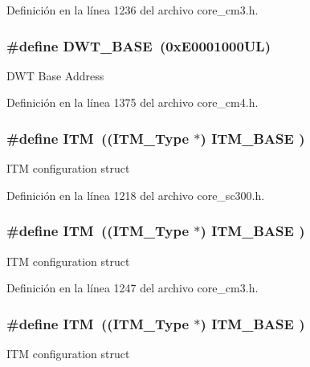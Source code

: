 Definición en la línea 1236 del archivo core\+\_\+cm3.\+h.

\subsubsection[{\texorpdfstring{D\+W\+T\+\_\+\+B\+A\+SE}{DWT_BASE}}]{\setlength{\rightskip}{0pt plus 5cm}\#define D\+W\+T\+\_\+\+B\+A\+SE~(0x\+E0001000\+U\+L)}\hypertarget{group___c_m_s_i_s__core__base_gafdab534f961bf8935eb456cb7700dcd2}{}\label{group___c_m_s_i_s__core__base_gafdab534f961bf8935eb456cb7700dcd2}
D\+WT Base Address 

Definición en la línea 1375 del archivo core\+\_\+cm4.\+h.

\subsubsection[{\texorpdfstring{I\+TM}{ITM}}]{\setlength{\rightskip}{0pt plus 5cm}\#define I\+TM~(({\bf I\+T\+M\+\_\+\+Type}       $\ast$)     {\bf I\+T\+M\+\_\+\+B\+A\+SE}      )}\hypertarget{group___c_m_s_i_s__core__base_gabae7cdf882def602cb787bb039ff6a43}{}\label{group___c_m_s_i_s__core__base_gabae7cdf882def602cb787bb039ff6a43}
I\+TM configuration struct 

Definición en la línea 1218 del archivo core\+\_\+sc300.\+h.

\subsubsection[{\texorpdfstring{I\+TM}{ITM}}]{\setlength{\rightskip}{0pt plus 5cm}\#define I\+TM~(({\bf I\+T\+M\+\_\+\+Type}       $\ast$)     {\bf I\+T\+M\+\_\+\+B\+A\+SE}      )}\hypertarget{group___c_m_s_i_s__core__base_gabae7cdf882def602cb787bb039ff6a43}{}\label{group___c_m_s_i_s__core__base_gabae7cdf882def602cb787bb039ff6a43}
I\+TM configuration struct 

Definición en la línea 1247 del archivo core\+\_\+cm3.\+h.

\subsubsection[{\texorpdfstring{I\+TM}{ITM}}]{\setlength{\rightskip}{0pt plus 5cm}\#define I\+TM~(({\bf I\+T\+M\+\_\+\+Type}       $\ast$)     {\bf I\+T\+M\+\_\+\+B\+A\+SE}      )}\hypertarget{group___c_m_s_i_s__core__base_gabae7cdf882def602cb787bb039ff6a43}{}\label{group___c_m_s_i_s__core__base_gabae7cdf882def602cb787bb039ff6a43}
I\+TM configuration struct 

